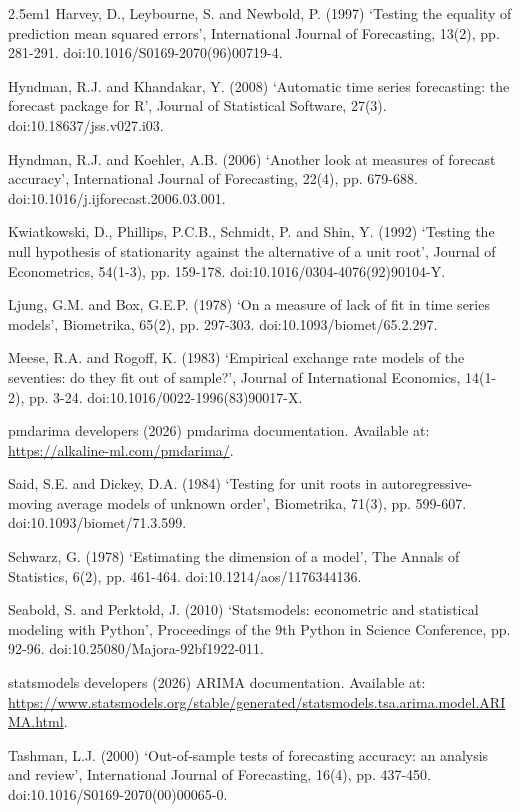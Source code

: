 \documentclass[11pt,a4paper]{article}
\begin{document}
\begin{hangparas}{2.5em}{1}
Harvey, D., Leybourne, S. and Newbold, P. (1997) `Testing the equality of prediction mean squared errors', International Journal of Forecasting, 13(2), pp. 281-291. doi:10.1016/S0169-2070(96)00719-4.

Hyndman, R.J. and Khandakar, Y. (2008) `Automatic time series forecasting: the forecast package for R', Journal of Statistical Software, 27(3). doi:10.18637/jss.v027.i03.

Hyndman, R.J. and Koehler, A.B. (2006) `Another look at measures of forecast accuracy', International Journal of Forecasting, 22(4), pp. 679-688. doi:10.1016/j.ijforecast.2006.03.001.

Kwiatkowski, D., Phillips, P.C.B., Schmidt, P. and Shin, Y. (1992) `Testing the null hypothesis of stationarity against the alternative of a unit root', Journal of Econometrics, 54(1-3), pp. 159-178. doi:10.1016/0304-4076(92)90104-Y.

Ljung, G.M. and Box, G.E.P. (1978) `On a measure of lack of fit in time series models', Biometrika, 65(2), pp. 297-303. doi:10.1093/biomet/65.2.297.

Meese, R.A. and Rogoff, K. (1983) `Empirical exchange rate models of the seventies: do they fit out of sample?', Journal of International Economics, 14(1-2), pp. 3-24. doi:10.1016/0022-1996(83)90017-X.

pmdarima developers (2026) pmdarima documentation. Available at: \url{https://alkaline-ml.com/pmdarima/}.

Said, S.E. and Dickey, D.A. (1984) `Testing for unit roots in autoregressive-moving average models of unknown order', Biometrika, 71(3), pp. 599-607. doi:10.1093/biomet/71.3.599.

Schwarz, G. (1978) `Estimating the dimension of a model', The Annals of Statistics, 6(2), pp. 461-464. doi:10.1214/aos/1176344136.

Seabold, S. and Perktold, J. (2010) `Statsmodels: econometric and statistical modeling with Python', Proceedings of the 9th Python in Science Conference, pp. 92-96. doi:10.25080/Majora-92bf1922-011.

statsmodels developers (2026) ARIMA documentation. Available at: \url{https://www.statsmodels.org/stable/generated/statsmodels.tsa.arima.model.ARIMA.html}.

Tashman, L.J. (2000) `Out-of-sample tests of forecasting accuracy: an analysis and review', International Journal of Forecasting, 16(4), pp. 437-450. doi:10.1016/S0169-2070(00)00065-0.
\end{hangparas}
\end{document}
